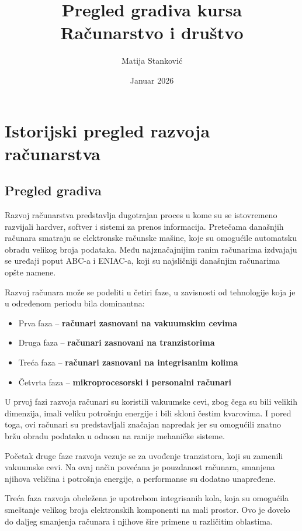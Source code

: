 \documentclass[a4paper, 12pt]{article}
\title{Pregled gradiva kursa \\ \large Računarstvo i društvo}
\author{Matija Stanković}
\date{Januar 2026}
\begin{document}
\maketitle
\newpage
\tableofcontents
\newpage


\section{Istorijski pregled razvoja računarstva}
\subsection{Pregled gradiva}
Razvoj računarstva predstavlja dugotrajan proces u kome su se istovremeno razvijali
hardver, softver i sistemi za prenos informacija. Pretečama današnjih računara smatraju se elektronske računske mašine, koje su omogućile automatsku obradu
velikog broja podataka. Među najznačajnijim ranim računarima izdvajaju se uređaji poput
ABC-a i ENIAC-a, koji su najsličniji današnjim računarima opšte namene.

Razvoj računara može se podeliti u četiri faze, u zavisnosti od tehnologije koja je u
određenom periodu bila dominantna:
\begin{itemize}
    \item Prva faza – \textbf{računari zasnovani na vakuumskim cevima}
    \item Druga faza – \textbf{računari zasnovani na tranzistorima}
    \item Treća faza – \textbf{računari zasnovani na integrisanim kolima}
    \item Četvrta faza – \textbf{mikroprocesorski i personalni računari}
\end{itemize}

U prvoj fazi razvoja računari su koristili vakuumske cevi, zbog čega su bili velikih
dimenzija, imali veliku potrošnju energije i bili skloni čestim kvarovima. I pored
toga, ovi računari su predstavljali značajan napredak jer su omogućili znatno bržu
obradu podataka u odnosu na ranije mehaničke sisteme.

Početak druge faze razvoja vezuje se za uvođenje tranzistora, koji su zamenili vakuumske cevi.
Na ovaj način povećana je pouzdanost računara, smanjena njihova veličina i potrošnja
energije, a performanse su dodatno unapređene.

Treća faza razvoja obeležena je upotrebom integrisanih kola, koja su omogućila smeštanje
velikog broja elektronskih komponenti na mali prostor. Ovo je dovelo do daljeg smanjenja
računara i njihove šire primene u različitim oblastima.
\end{document}
